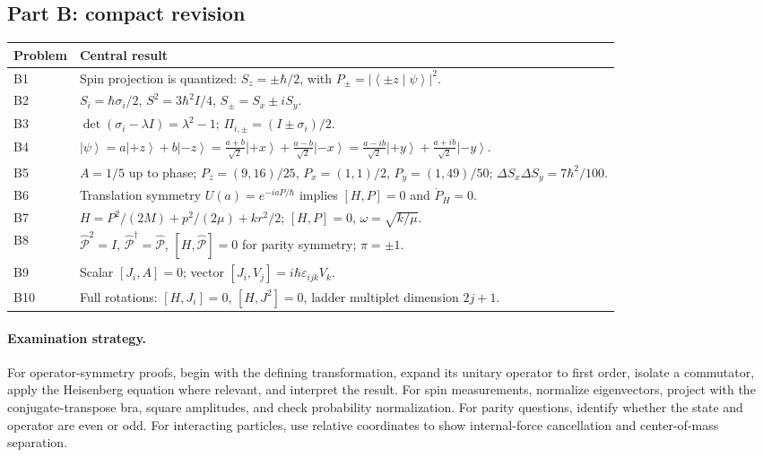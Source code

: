 \documentclass[11pt,a4paper]{article}
\theoremstyle{definition}
\newcommand{\ket}[1]{\left|#1\right\rangle}
\newcommand{\ip}[2]{\left\langle#1\middle|#2\right\rangle}
\newcommand{\PP}{\hat{\mathcal P}}
\begin{document}
\subsection*{Part B: compact revision}
\begin{center}\small
\begin{tabularx}{\textwidth}{@{}p{}X@{}}\toprule
Problem & Central result \\ \midrule
B1 & Spin projection is quantized: \(S_z=\pm\hbar/2\), with \(P_\pm=|\ip{\pm z}{\psi}|^2\).\\
B2 & \(S_i=\hbar\sigma_i/2\), \(S^2=3\hbar^2I/4\), \(S_\pm=S_x\pm iS_y\).\\
B3 & \(\det(\sigma_i-\lambda I)=\lambda^2-1\); \(\Pi_{i,\pm}=(I\pm\sigma_i)/2\).\\
B4 & \(\ket\psi=a\ket{+z}+b\ket{-z}=\frac{a+b}{\sqrt2}\ket{+x}+\frac{a-b}{\sqrt2}\ket{-x}=\frac{a-ib}{\sqrt2}\ket{+y}+\frac{a+ib}{\sqrt2}\ket{-y}\).\\
B5 & \(A=1/5\) up to phase; \(P_z=(9,16)/25\), \(P_x=(1,1)/2\), \(P_y=(1,49)/50\); \(\Delta S_x\Delta S_y=7\hbar^2/100\).\\
B6 & Translation symmetry \(U(a)=e^{-iaP/\hbar}\) implies \([H,P]=0\) and \(\dot P_H=0\).\\
B7 & \(H=P^2/(2M)+p^2/(2\mu)+kr^2/2\); \([H,P]=0\), \(\omega=\sqrt{k/\mu}\).\\
B8 & \(\PP^2=I\), \(\PP^\dagger=\PP\), \([H,\PP]=0\) for parity symmetry; \(\pi=\pm1\).\\
B9 & Scalar \([J_i,A]=0\); vector \([J_i,V_j]=i\hbar\varepsilon_{ijk}V_k\).\\
B10 & Full rotations: \([H,J_i]=0\), \([H,J^2]=0\), ladder multiplet dimension \(2j+1\).\\ \bottomrule
\end{tabularx}
\end{center}
\paragraph{Examination strategy.} For operator-symmetry proofs, begin with the defining transformation, expand its unitary operator to first order, isolate a commutator, apply the Heisenberg equation where relevant, and interpret the result. For spin measurements, normalize eigenvectors, project with the conjugate-transpose bra, square amplitudes, and check probability normalization. For parity questions, identify whether the state and operator are even or odd. For interacting particles, use relative coordinates to show internal-force cancellation and center-of-mass separation.
\end{document}
